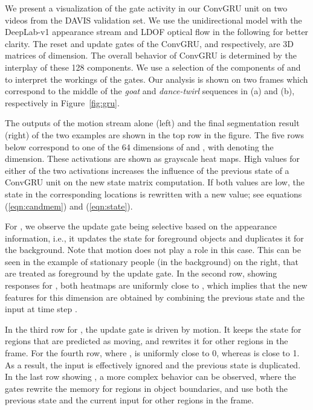 We present a visualization of the gate activity in our ConvGRU unit on two
videos from the DAVIS validation set. We use the unidirectional model with the DeepLab-v1 appearance stream and LDOF optical flow in the
following for better clarity. The reset and update gates of the ConvGRU, 
and  respectively, are 3D matrices of  dimension.  The overall behavior of ConvGRU is determined by the
interplay of these 128 components. We use a selection of the components of
 and  to interpret the workings of the gates. Our analysis is
shown on two frames which correspond to the middle of the {\it goat} and {\it
dance-twirl} sequences in (a) and (b), respectively in Figure~\ref{fig:gru}.

The outputs of the motion stream alone (left) and the final segmentation result
(right) of the two examples are shown in the top row in the figure. The five
rows below correspond to one of the 64 dimensions of  and ,
with  denoting the dimension. These activations are shown as grayscale heat
maps. High values for either of the two activations increases the influence of
the previous state of a ConvGRU unit on the new state matrix computation. If
both values are low, the state in the corresponding locations is rewritten with
a new value; see equations (\ref{eqn:candmem}) and (\ref{eqn:state}).

For , we observe the update gate being selective based on the appearance
information, i.e., it updates the state for foreground objects and duplicates
it for the background. Note that motion does not play a role in this case. This
can be seen in the example of stationary people (in the background) on the
right, that are treated as foreground by the update gate. In the second row,
showing responses for , both heatmaps are uniformly close to , which
implies that the new features for this dimension are obtained by combining the
previous state and the input at time step .

In the third row for , the update gate is driven by motion. It keeps the
state for regions that are predicted as moving, and rewrites it for other
regions in the frame. For the fourth row, where ,  is uniformly
close to 0, whereas  is close to 1. As a result, the input is
effectively ignored and the previous state is duplicated. In the last row
showing , a more complex behavior can be observed, where the gates
rewrite the memory for regions in object boundaries, and use both the previous
state and the current input for other regions in the frame.

